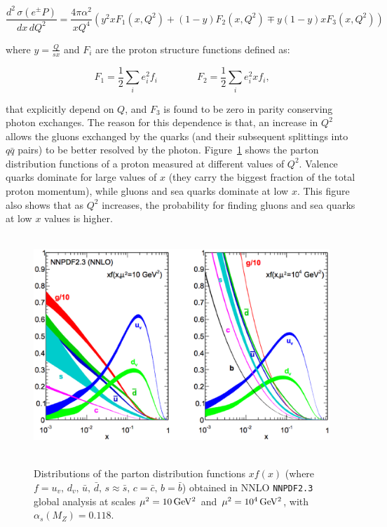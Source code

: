 \begin{equation}
\frac{d^2\,\sigma (e^{\pm}P)}{dx\,dQ^2} = \frac{4\pi\alpha^2}{xQ^4} \left( y^2 x F_1(x, Q^2) + (1-y) F_2(x, Q^2) \mp y(1-y)x F_3(x, Q^2) \right)
\label{eq:DISxsection}
\end{equation}

\noindent where $y = \frac{Q}{sx}$ and $F_i$ are the proton structure functions defined as:

\begin{equation}
F_1 = \frac{1}{2}\sum_i{e_i^2 f_i} \qquad \qquad F_2 = \frac{1}{2}\sum_i{e_i^2 x f_i},
\label{eq:DISformfactors}
\end{equation}

\noindent that explicitly depend on $Q$, and $F_3$ is found to be zero in parity conserving photon exchanges.
The reason for this dependence is that, an increase in $Q^2$ allows the gluons exchanged by the quarks (and their subsequent splittings into $q\bar{q}$ pairs) to be better resolved by the photon.
Figure~\ref{fig:ProtonPDFs} shows the parton distribution functions of a proton measured at different values of $Q^2$.
Valence quarks dominate for large values of $x$ (they carry the biggest fraction of the total proton momentum), while gluons and sea quarks dominate at low $x$. 
This figure also shows that as $Q^2$ increases, the probability for finding gluons and sea quarks at low $x$ values is higher.

\begin{figure}[!ht]
  \begin{center}
    \mbox{
        \includegraphics[width=0.995\textwidth]{StandardModel/Figures/ProtonPDF.eps}
    }
  \end{center}
  \caption[Distributions of the parton distribution functions $xf(x)$.]{Distributions of the parton distribution functions $xf(x)$ (where $f = u_v,\, d_v,\, \bar{u},\, \bar{d},\, s \approx \bar{s},\, c=\bar{c},\, b=\bar{b}$) obtained in NNLO \texttt{NNPDF2.3} global analysis at scales $\mu^2 = \unit[10]{GeV^2}$ and $\mu^2 = \unit[10^4]{GeV^2}$, with $\alpha_s(M_Z) = 0.118$. \protect\cite{Beringer:1900zz}}
  \label{fig:ProtonPDFs}
\end{figure}


